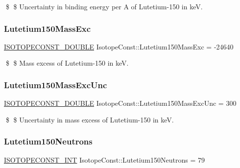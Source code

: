 \$ \$ Uncertainty in binding energy per A of Lutetium-\/150 in keV. \mbox{\label{group___isotope_const-_lutetium-_lu150_ga2fc9d0c5eda09ada03fd0eca210cc907}} 
\subsubsection{\texorpdfstring{Lutetium150\+Mass\+Exc}{Lutetium150MassExc}}
{\footnotesize\ttfamily \mbox{\hyperlink{group___isotope_const-_macros_ga8f45a7272ce02c0b4c65c44636ed719a}{I\+S\+O\+T\+O\+P\+E\+C\+O\+N\+S\+T\+\_\+\+D\+O\+U\+B\+LE}} Isotope\+Const\+::\+Lutetium150\+Mass\+Exc = -\/24640}

\$ \$ Mass excess of Lutetium-\/150 in keV. \mbox{\label{group___isotope_const-_lutetium-_lu150_ga9104f8d89702984a3599350263017f30}} 
\subsubsection{\texorpdfstring{Lutetium150\+Mass\+Exc\+Unc}{Lutetium150MassExcUnc}}
{\footnotesize\ttfamily \mbox{\hyperlink{group___isotope_const-_macros_ga8f45a7272ce02c0b4c65c44636ed719a}{I\+S\+O\+T\+O\+P\+E\+C\+O\+N\+S\+T\+\_\+\+D\+O\+U\+B\+LE}} Isotope\+Const\+::\+Lutetium150\+Mass\+Exc\+Unc = 300}

\$ \$ Uncertainty in mass excess of Lutetium-\/150 in keV. \mbox{\label{group___isotope_const-_lutetium-_lu150_ga0face9809013d9d7120bab64be048471}} 
\subsubsection{\texorpdfstring{Lutetium150\+Neutrons}{Lutetium150Neutrons}}
{\footnotesize\ttfamily \mbox{\hyperlink{group___isotope_const-_macros_ga5f18360b3e99483a35c32d789e62621c}{I\+S\+O\+T\+O\+P\+E\+C\+O\+N\+S\+T\+\_\+\+I\+NT}} Isotope\+Const\+::\+Lutetium150\+Neutrons = 79}

